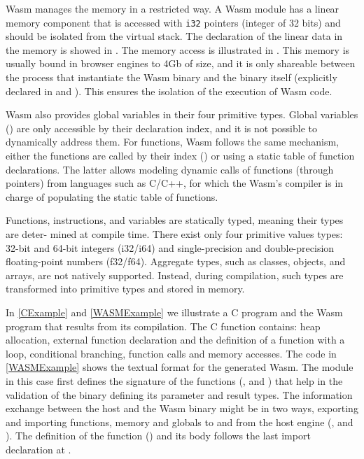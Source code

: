 \label{background:wasm:memory}


Wasm  manages the memory in a restricted way. A Wasm  module has a linear memory component that is accessed with \texttt{i32} pointers (integer of 32 bits) and should be isolated from the virtual stack. The declaration of the linear data in the memory is showed in . The memory access is illustrated in . This memory is usually bound in browser engines to 4Gb of size, and it is only shareable between the process that instantiate the Wasm  binary and the binary itself (explicitly declared in  and ). This ensures the isolation of the execution of Wasm  code. 

Wasm  also provides global variables in their four primitive types. Global variables () are only accessible by their declaration index, and it is not possible to dynamically address them. For functions, Wasm  follows the same mechanism, either the functions are called by their index () or using a static table of function declarations. The latter allows modeling dynamic calls of functions (through pointers) from languages such as C/C++, for which the Wasm's compiler is in charge of populating the static table of functions.


\label{background:wasm:execution}

Functions, instructions, and variables are statically typed, meaning their types are deter- 
mined at compile time. There exist only four primitive values types: 32-bit and 64-bit integers 
(i32/i64) and single-precision and double-precision floating-point numbers (f32/f64). Aggregate 
types, such as classes, objects, and arrays, are not natively supported. Instead, during compilation, 
such types are transformed into primitive types and stored in memory.

In \autoref{CExample} and \autoref{WASMExample} we illustrate a C program and the Wasm program that results from its compilation. The C function contains: heap allocation, external function declaration and the definition of a function with a loop, conditional branching, function calls and memory accesses. The code in \autoref{WASMExample} shows the textual format for the generated Wasm. The module in this case first defines the signature of the functions (,   and  )  that help in the validation of the binary defining its parameter and result types. The information exchange between the host and the Wasm  binary might be in two ways, exporting and importing functions, memory and globals to and from the host engine (,  and ). The definition of the function () and its body follows the last import declaration at . 


